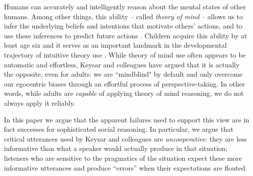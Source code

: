 \documentclass[10pt,letterpaper]{article}
\begin{document}
Humans can accurately and intelligently reason about the mental states of other humans. Among other things, this ability -- called \emph{theory of mind} \cite{PremackWoodruff78_ChimpanzeeToM} -- allows us to infer the underlying beliefs and intentions that motivate others' actions, and to use these inferences to predict future actions \cite{BakerSaxeTenenbaum09_ActionUnderstandingInversePlanning}. Children acquire this ability by at least age six \cite{WimmerPerner83_BeliefsAboutBeliefs, WellmanCrossWatson01_ToMMetaAnalysis} and it serves as an important landmark in the developmental trajectory of intuitive theory use \cite{GopnikWellman12_ReconstructingConstructivism}.
%
While theory of mind use often appears to be automatic and effortless, Keysar and colleagues \cite{KeysarBarr___Brauner00_TakingPerspective, KeysarLinBarr03_LimitsOnTheoryOfMindUse, LinKeysarEpley10_ReflexivelyMindblind} have argued that it is actually the opposite, even for adults: we are ``mindblind" by default and only overcome our egocentric biases through an effortful process of perspective-taking. In other words, while adults are \emph{capable} of applying theory of mind reasoning, we do not always apply it reliably. 

In this paper we argue that the apparent failures used to support this view are in fact successes for sophisticated social reasoning. In particular, we argue that critical utterances used by Keysar and colleagues are \emph{uncooperative}: they are less informative than what a speaker would actually produce in that situation; listeners who are sensitive to the pragmatics of the situation expect these more informative utterances and produce ``errors'' when their expectations are flouted. 
\end{document}
